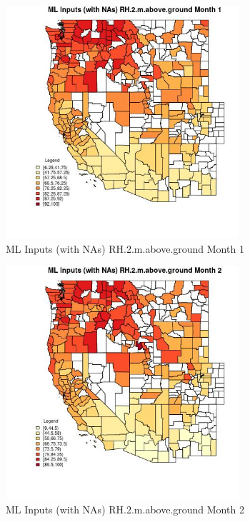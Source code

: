 \clearpage 

\begin{figure} 
\centering  
\includegraphics[width=0.77\textwidth]{Code_Outputs/Report_ML_input_PM25_Step4_part_e_de_duplicated_aves_compiled_2019-05-21wNAs_CountyRH2mabovegroundmedianMonth1.jpg} 
\caption{\label{fig:Report_ML_input_PM25_Step4_part_e_de_duplicated_aves_compiled_2019-05-21wNAsCountyRH2mabovegroundmedianMonth1}ML Inputs (with NAs) RH.2.m.above.ground Month 1} 
\end{figure} 
 

\begin{figure} 
\centering  
\includegraphics[width=0.77\textwidth]{Code_Outputs/Report_ML_input_PM25_Step4_part_e_de_duplicated_aves_compiled_2019-05-21wNAs_CountyRH2mabovegroundmedianMonth2.jpg} 
\caption{\label{fig:Report_ML_input_PM25_Step4_part_e_de_duplicated_aves_compiled_2019-05-21wNAsCountyRH2mabovegroundmedianMonth2}ML Inputs (with NAs) RH.2.m.above.ground Month 2} 
\end{figure} 
 


